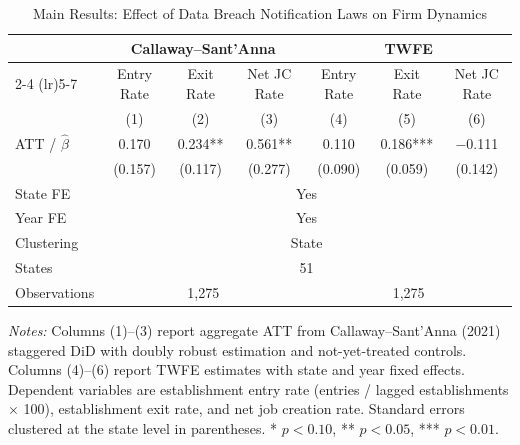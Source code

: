 \begin{table}[H]
\centering
\caption{Main Results: Effect of Data Breach Notification Laws on Firm Dynamics}
\label{tab:main}
\footnotesize
\begin{tabular}{lcccccc}
\toprule
& \multicolumn{3}{c}{Callaway--Sant'Anna} & \multicolumn{3}{c}{TWFE} \\
\cmidrule(lr){2-4} \cmidrule(lr){5-7}
& Entry Rate & Exit Rate & Net JC Rate & Entry Rate & Exit Rate & Net JC Rate \\
& (1) & (2) & (3) & (4) & (5) & (6) \\
\midrule
ATT / $\hat{\beta}$ & 0.170 & 0.234** & 0.561** & 0.110 & 0.186*** & $-$0.111 \\
& (0.157) & (0.117) & (0.277) & (0.090) & (0.059) & (0.142) \\
\midrule
State FE & \multicolumn{6}{c}{Yes} \\
Year FE & \multicolumn{6}{c}{Yes} \\
Clustering & \multicolumn{6}{c}{State} \\
States & \multicolumn{6}{c}{51} \\
Observations & \multicolumn{3}{c}{1,275} & \multicolumn{3}{c}{1,275} \\
\bottomrule
\end{tabular}

\vspace{0.5em}
\noindent\parbox{\textwidth}{\small \textit{Notes:} Columns (1)--(3) report aggregate ATT from Callaway--Sant'Anna (2021) staggered DiD with doubly robust estimation and not-yet-treated controls. Columns (4)--(6) report TWFE estimates with state and year fixed effects. Dependent variables are establishment entry rate (entries / lagged establishments $\times$ 100), establishment exit rate, and net job creation rate. Standard errors clustered at the state level in parentheses. * $p<0.10$, ** $p<0.05$, *** $p<0.01$.}
\end{table}

